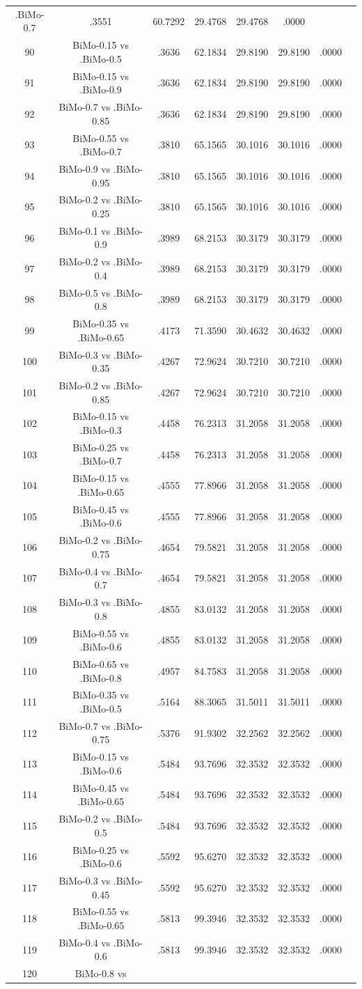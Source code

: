 \documentclass[a4paper,10pt]{article}
\begin{document}
\begin{landscape}
\begin{table}[!htp]
\begin{tabular}{cccccccc}
.BiMo-0.7&.3551&60.7292&29.4768&29.4768&.0000\\90&BiMo-0.15 vs .BiMo-0.5&.3636&62.1834&29.8190&29.8190&.0000\\91&BiMo-0.15 vs .BiMo-0.9&.3636&62.1834&29.8190&29.8190&.0000\\92&BiMo-0.7 vs .BiMo-0.85&.3636&62.1834&29.8190&29.8190&.0000\\93&BiMo-0.55 vs .BiMo-0.7&.3810&65.1565&30.1016&30.1016&.0000\\94&BiMo-0.9 vs .BiMo-0.95&.3810&65.1565&30.1016&30.1016&.0000\\95&BiMo-0.2 vs .BiMo-0.25&.3810&65.1565&30.1016&30.1016&.0000\\96&BiMo-0.1 vs .BiMo-0.9&.3989&68.2153&30.3179&30.3179&.0000\\97&BiMo-0.2 vs .BiMo-0.4&.3989&68.2153&30.3179&30.3179&.0000\\98&BiMo-0.5 vs .BiMo-0.8&.3989&68.2153&30.3179&30.3179&.0000\\99&BiMo-0.35 vs .BiMo-0.65&.4173&71.3590&30.4632&30.4632&.0000\\100&BiMo-0.3 vs .BiMo-0.35&.4267&72.9624&30.7210&30.7210&.0000\\101&BiMo-0.2 vs .BiMo-0.85&.4267&72.9624&30.7210&30.7210&.0000\\102&BiMo-0.15 vs .BiMo-0.3&.4458&76.2313&31.2058&31.2058&.0000\\103&BiMo-0.25 vs .BiMo-0.7&.4458&76.2313&31.2058&31.2058&.0000\\104&BiMo-0.15 vs .BiMo-0.65&.4555&77.8966&31.2058&31.2058&.0000\\105&BiMo-0.45 vs .BiMo-0.6&.4555&77.8966&31.2058&31.2058&.0000\\106&BiMo-0.2 vs .BiMo-0.75&.4654&79.5821&31.2058&31.2058&.0000\\107&BiMo-0.4 vs .BiMo-0.7&.4654&79.5821&31.2058&31.2058&.0000\\108&BiMo-0.3 vs .BiMo-0.8&.4855&83.0132&31.2058&31.2058&.0000\\109&BiMo-0.55 vs .BiMo-0.6&.4855&83.0132&31.2058&31.2058&.0000\\110&BiMo-0.65 vs .BiMo-0.8&.4957&84.7583&31.2058&31.2058&.0000\\111&BiMo-0.35 vs .BiMo-0.5&.5164&88.3065&31.5011&31.5011&.0000\\112&BiMo-0.7 vs .BiMo-0.75&.5376&91.9302&32.2562&32.2562&.0000\\113&BiMo-0.15 vs .BiMo-0.6&.5484&93.7696&32.3532&32.3532&.0000\\114&BiMo-0.45 vs .BiMo-0.65&.5484&93.7696&32.3532&32.3532&.0000\\115&BiMo-0.2 vs .BiMo-0.5&.5484&93.7696&32.3532&32.3532&.0000\\116&BiMo-0.25 vs .BiMo-0.6&.5592&95.6270&32.3532&32.3532&.0000\\117&BiMo-0.3 vs .BiMo-0.45&.5592&95.6270&32.3532&32.3532&.0000\\118&BiMo-0.55 vs .BiMo-0.65&.5813&99.3946&32.3532&32.3532&.0000\\119&BiMo-0.4 vs .BiMo-0.6&.5813&99.3946&32.3532&32.3532&.0000\\120&BiMo-0.8 vs 
\end{tabular}
\end{table}
\end{landscape}
\end{document}
